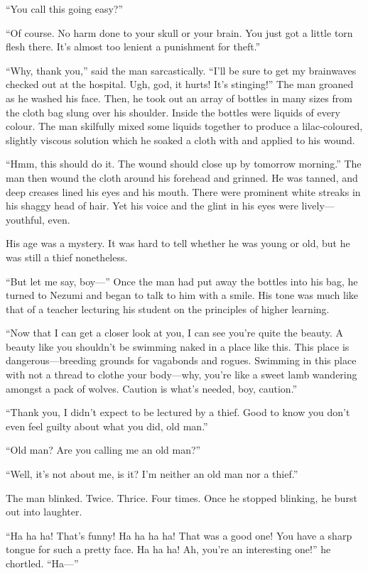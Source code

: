 ``You call this going easy?''

``Of course. No harm done to your skull or your brain. You just got a
little torn flesh there. It's almost too lenient a punishment for
theft.''

``Why, thank you,'' said the man sarcastically. ``I'll be sure to get my
brainwaves checked out at the hospital. Ugh, god, it hurts! It's
stinging!'' The man groaned as he washed his face. Then, he took out an
array of bottles in many sizes from the cloth bag slung over his
shoulder. Inside the bottles were liquids of every colour. The man
skilfully mixed some liquids together to produce a lilac-coloured,
slightly viscous solution which he soaked a cloth with and applied to
his wound.

``Hmm, this should do it. The wound should close up by tomorrow
morning.'' The man then wound the cloth around his forehead and grinned.
He was tanned, and deep creases lined his eyes and his mouth. There were
prominent white streaks in his shaggy head of hair. Yet his voice and
the glint in his eyes were lively---youthful, even.

His age was a mystery. It was hard to tell whether he was young or old,
but he was still a thief nonetheless.

``But let me say, boy---'' Once the man had put away the bottles into his
bag, he turned to Nezumi and began to talk to him with a smile. His tone
was much like that of a teacher lecturing his student on the principles
of higher learning.

``Now that I can get a closer look at you, I can see you're quite the
beauty. A beauty like you shouldn't be swimming naked in a place like
this. This place is dangerous---breeding grounds for vagabonds and rogues.
Swimming in this place with not a thread to clothe your body---why, you're
like a sweet lamb wandering amongst a pack of wolves. Caution is what's
needed, boy, caution.''

``Thank you, I didn't expect to be lectured by a thief. Good to know you
don't even feel guilty about what you did, old man.''

``Old man? Are you calling me an old man?''

``Well, it's not about me, is it? I'm neither an old man nor a thief.''

The man blinked. Twice. Thrice. Four times. Once he stopped
blinking, he burst out into laughter.

``Ha ha ha! That's funny! Ha ha ha ha! That was a good one! You have a
sharp tongue for such a pretty face. Ha ha ha! Ah, you're an interesting
one!'' he chortled. ``Ha---''

